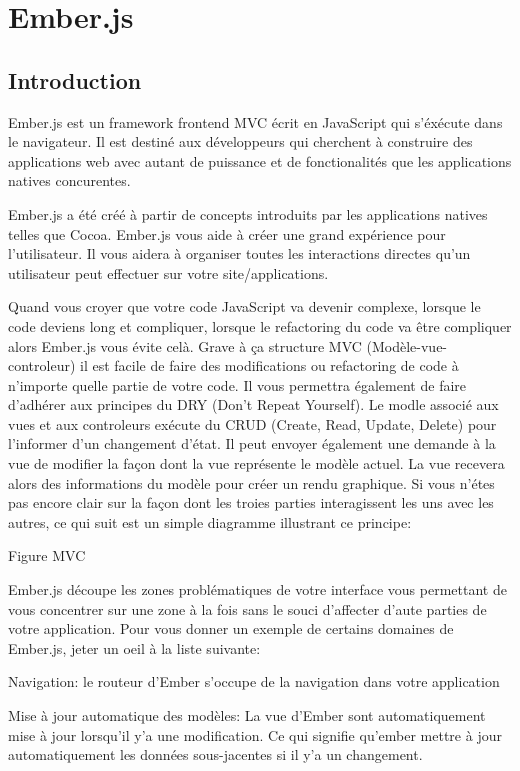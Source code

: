 \chapter{Ember.js}
\label{ch:ember}

\section*{Introduction}


Ember.js est un framework frontend MVC écrit en JavaScript qui s’éxécute dans le navigateur. Il est destiné aux développeurs qui cherchent à construire des applications web avec autant de puissance et de fonctionalités que les applications natives concurentes.

Ember.js a été créé à partir de concepts introduits par les applications natives telles que Cocoa. Ember.js vous aide à créer une grand expérience pour l’utilisateur. Il vous aidera à organiser toutes les interactions directes qu’un utilisateur peut effectuer sur votre site/applications.

Quand vous croyer que votre code JavaScript va devenir complexe, lorsque le code deviens long et compliquer, lorsque le refactoring du code va être compliquer alors Ember.js vous évite celà. Grave à ça structure MVC (Modèle-vue-controleur) il est facile de faire des modifications ou refactoring de code à n’importe quelle partie de votre code. Il vous permettra également de faire d’adhérer aux principes du DRY (Don’t Repeat Yourself). Le modle associé aux vues et aux controleurs exécute du CRUD (Create, Read, Update, Delete) pour l’informer d’un changement d’état. Il peut envoyer également une demande à la vue de modifier la façon dont la vue représente le modèle actuel. La vue recevera alors des informations du modèle pour créer un rendu graphique. Si vous n’étes pas encore clair sur la façon dont les troies parties interagissent les uns avec les autres, ce qui suit est un simple diagramme illustrant ce principe:

Figure MVC


Ember.js découpe les zones problématiques de votre interface vous permettant de vous concentrer sur une zone à la fois sans le souci d’affecter d’aute parties de votre application. Pour vous donner un exemple de certains domaines de Ember.js, jeter un oeil à la liste suivante:

    Navigation: le routeur d’Ember s’occupe de la navigation dans votre application

    Mise à jour automatique des modèles: La vue d’Ember sont automatiquement mise à jour lorsqu’il y’a une modification. Ce qui signifie qu’ember mettre à jour automatiquement les données sous-jacentes si il y’a un changement.

